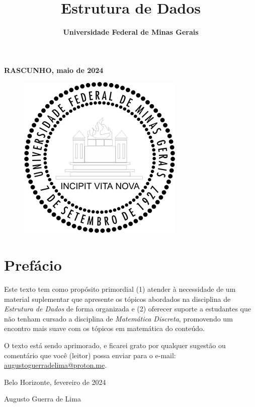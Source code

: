 \documentclass{article}
\title{\Huge\textbf{Estrutura de Dados}}
\author{}
\date{\textbf{Universidade Federal de Minas Gerais}}
\begin{document}
\maketitle
\textbf{RASCUNHO, maio de 2024}
\begin{figure}
  \centering
  \includegraphics[width=0.2\linewidth]{img/UFMG.png}
\end{figure}

\newpage

\large

\section*{Prefácio}

Este texto tem como propósito primordial (1) atender à necessidade de um material suplementar que apresente os tópicos abordados na disciplina de \textit{Estrutura de Dados} de forma organizada e (2) oferecer suporte a estudantes que não tenham cursado a disciplina de \textit{Matemática Discreta}, promovendo um encontro mais suave com os tópicos em matemática do conteúdo.

O texto está sendo aprimorado, e ficarei grato por qualquer sugestão ou comentário que você (leitor) possa enviar para o e-mail: \href{mailto:augustoguerradelima@proton.me}{augustoguerradelima@proton.me}.
\vspace{0.5cm}

{\raggedleft
Belo Horizonte, fevereiro de 2024

Augusto Guerra de Lima

\smiley{}
\par}

\newpage

\tableofcontents

\newpage










\end{document}
